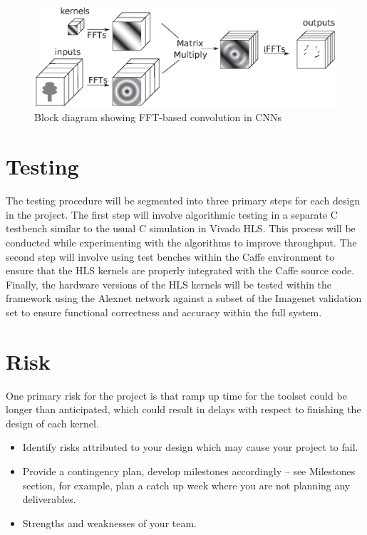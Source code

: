\documentclass[conference,compsoc]{IEEEtran/IEEEtran}
\begin{document}
\begin{figure}[!h]
\begin{center}
\centering
\includegraphics[width=1\columnwidth]{CNN-FFT.eps}
\caption{Block diagram showing FFT-based convolution in CNNs}
\label{CNN-FFT}
\end{center}
\end{figure}

\section{Testing}\label{section:testing}
The testing procedure will be segmented into three primary steps for each design in the project.
The first step will involve algorithmic testing in a separate C testbench similar to the usual C
simulation in Vivado HLS. This process will be conducted while experimenting with the algorithms
to improve throughput. The second step will involve using test benches within the Caffe environment
to ensure that the HLS kernels are properly integrated with the Caffe source code. Finally, the
hardware versions of the HLS kernels will be tested within the framework using the Alexnet network
against a subset of the Imagenet validation set to ensure functional correctness and accuracy
within the full system.

\section{Risk}\label{section:risk}

One primary risk for the project is that ramp up time for the toolset could be longer than
anticipated, which could result in delays with respect to finishing the design of each kernel.

\begin{itemize}
\item Identify risks attributed to your design which may cause your project to fail.
\item Provide a contingency plan, develop milestones accordingly -- see Milestones section, for example, plan a catch up week where you are not planning any deliverables.
\item Strengths and weaknesses of your team.
\end{itemize}
\end{document}
